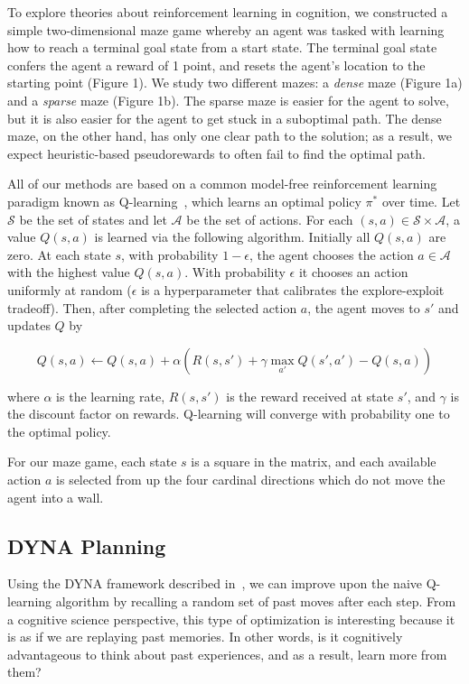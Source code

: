 \documentclass[notitlepage]{article}
\begin{document}
To explore theories about reinforcement learning in cognition, we constructed a simple two-dimensional maze game whereby an agent was tasked with learning how to reach a terminal goal state from a start state. The terminal goal state confers the agent a reward of 1 point, and resets the agent's location to the starting point (Figure 1). We study two different mazes: a \textit{dense} maze (Figure 1a) and a \textit{sparse} maze (Figure 1b). The sparse maze is easier for the agent to solve, but it is also easier for the agent to get stuck in a suboptimal path. The dense maze, on the other hand, has only one clear path to the solution; as a result, we expect heuristic-based pseudorewards to often fail to find the optimal path.

All of our methods are based on a common model-free reinforcement learning paradigm known as Q-learning~\cite{sutton1998reinforcement}, which learns an optimal policy $\pi^*$ over time. Let $\mathcal{S}$ be the set of states and let $\mathcal{A}$ be the set of actions. For each $(s,a) \in \mathcal{S} \times \mathcal{A}$, a value $Q(s,a)$ is learned via the following algorithm. Initially all $Q(s,a)$ are zero. At each state $s$, with probability $1 - \epsilon$, the agent chooses the action $a \in \mathcal{A}$ with the highest value $Q(s,a)$. With probability $\epsilon$ it chooses an action uniformly at random ($\epsilon$ is a hyperparameter that calibrates the explore-exploit tradeoff). Then, after completing the selected action $a$, the agent moves to $s'$ and updates $Q$ by

\begin{equation}
Q(s,a) \leftarrow Q(s,a) + \alpha (R(s, s') + \gamma \max_{a'} Q(s', a') - Q(s,a))
\label{eq:q-learn}
\end{equation}

where $\alpha$ is the learning rate, $R(s, s')$ is the reward received at state $s'$, and $\gamma$ is the discount factor on rewards. Q-learning will converge with probability one to the optimal policy. 

For our maze game, each state $s$ is a square in the matrix, and each available action $a$ is selected from up the four cardinal directions which do not move the agent into a wall. 

\subsection*{DYNA Planning}

Using the DYNA framework described in~\cite{sutton1998reinforcement}, we can improve upon the naive Q-learning algorithm by recalling a random set of past moves after each step. From a cognitive science perspective, this type of optimization is interesting because it is as if we are replaying past memories. In other words, is it cognitively advantageous to think about past experiences, and as a result, learn more from them? 
\end{document}
